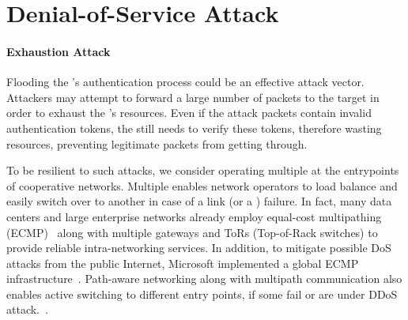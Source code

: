 
\section{Denial-of-Service Attack}
\label{sec:disrupting}

\paragraph{Exhaustion Attack}
Flooding the \tp's authentication process could be an effective attack vector. Attackers
may attempt to forward a large number of packets to the target \tp in order to exhaust the
\tp's resources. Even if the attack packets contain invalid authentication tokens, the \tp still 
needs to verify these tokens, therefore wasting resources, preventing legitimate packets from getting through. 

To be resilient to such attacks, we consider operating multiple \tps at the entrypoints
of cooperative networks. Multiple \tps enables network operators 
to load balance and easily switch over to another \tp in case of a link (or a \tp) 
failure. In fact, many data centers and large enterprise networks already employ equal-cost 
multipathing (ECMP)~\cite{rfc2991,rfc2992} along with multiple gateways and ToRs (Top-of-Rack 
switches) to provide reliable intra-networking services. In addition, to mitigate possible DoS 
attacks from the public Internet, Microsoft implemented a global ECMP 
infrastructure~\cite{ms2020ecmp}. Path-aware networking along with multipath communication 
also enables active switching to different entry points, if some fail or are under DDoS attack.~\cite{Dawkins2018,Trammell2018}.


